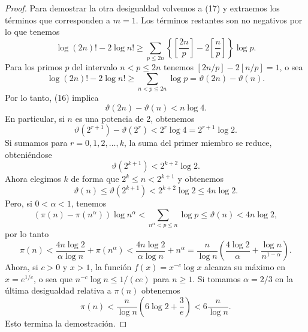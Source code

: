 \documentclass[12pt,a4paper]{book}
\begin{document}
\begin{proof}
        Para demostrar la otra desigualdad volvemos a (17) y extraemos los términos
        que corresponden a $m=1$. Los términos restantes son no negativos por lo que
        tenemos
        \begin{equation*}
            \log(2n)!-2\log n!\geq\sum_{p\leq2n}\left\{\left[\frac{2n}{p}\right]-2\left[\frac{n}{p}\right]\right\}\log p.
        \end{equation*}
        Para los primos $p$ del intervalo $n<p\leq2n$ tenemos $[2n/p]-2[n/p]=1$, o sea
        \begin{equation*}
            \log(2n)!-2\log n!\geq\sum_{n<p\leq2n}\log p=\vartheta(2n)-\vartheta(n).
        \end{equation*}
        Por lo tanto, (16) implica
        \begin{equation*}
            \vartheta(2n)-\vartheta(n)<n\log4.
        \end{equation*}
        En particular, si $n$ es una potencia de 2, obtenemos
        \begin{equation*}
            \vartheta(2^{r+1})-\vartheta(2^r)<2^r\log4=2^{r+1}\log2.
        \end{equation*}
        Si sumamos para $r=0,1,2,\dots,k$, la suma del primer miembro se reduce,
        obteniéndose
        \begin{equation*}
            \vartheta(2^{k+1})<2^{k+2}\log2.
        \end{equation*}
        Ahora elegimos $k$ de forma que $2^k\leq n<2^{k+1}$ y obtenemos
        \begin{equation*}
            \vartheta(n)\leq\vartheta(2^{k+1})<2^{k+2}\log2\leq4n\log2.
        \end{equation*}
        Pero, si $0<\alpha<1$, tenemos
        \begin{equation*}
            (\pi(n)-\pi(n^\alpha))\log n^\alpha<\sum_{n^\alpha<p\leq n}\log p\leq\vartheta(n)<4n\log2,
        \end{equation*}
        por lo tanto
        \begin{equation*}
            \pi(n)<\frac{4n\log2}{\alpha\log n}+\pi(n^\alpha)<\frac{4n\log2}{\alpha\log n}+n^\alpha
            =\frac{n}{\log n}\left(\frac{4\log2}{\alpha}+\frac{\log n}{n^{1-\alpha}}\right).
        \end{equation*}
        Ahora, si $c>0$ y $x>1$, la función $f(x)=x^{-c}\log x$ alcanza su máximo en
        $x=e^{1/c}$, o sea que $n^{-c}\log n\leq1/(ce)$ para $n\geq1$. Si tomamos
        $\alpha=2/3$ en la última desigualdad relativa a $\pi(n)$ obtenemos
        \begin{equation*}
            \pi(n)<\frac{n}{\log n}\left(6\log2+\frac{3}{e}\right)<6\frac{n}{\log n}.
        \end{equation*}
        Esto termina la demostración.
    \end{proof}
\end{document}
